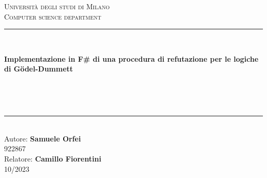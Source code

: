 \documentclass{oist}
\begin{document}
\pagestyle{empty}
\begin{titlepage}
    \begin{center}
        \vfill
        {\large \scshape Università degli studi di Milano}\\[0.1cm]
        {\large \scshape Computer science department}\\[0.5cm]
        \rule{\textwidth}{1.5pt}\\[0cm]
        {\huge \bfseries  Implementazione in F\# di una procedura di refutazione per le logiche di G\"odel-Dummett \par \ }\\[-0.5cm]
        \rule{\textwidth}{1.5pt}\\[2.5cm]
        {\hfill \large Autore: \textbf{Samuele Orfei}} \\
        \vspace{0.1cm}
        {\hfill \large 922867} \\
        \vspace{0.5cm}
        {\hfill \large Relatore: \textbf{Camillo Fiorentini}} \\
        \vspace{1cm}
        \hfill  10/2023
    \end{center}
\end{titlepage}
\end{document}
